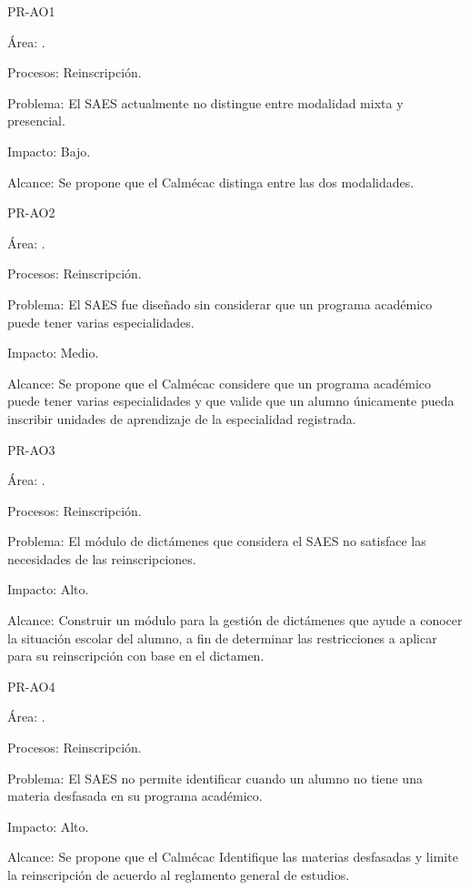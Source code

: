 \begin{AreaOportunidad}{PR-AO1}
	\item[Área:] .
	\item[Procesos:] Reinscripción.
	\item[Problema:] El SAES actualmente no distingue entre modalidad mixta y presencial.
	\item[Impacto:] Bajo.
	\item[Alcance:] Se propone que el Calmécac distinga entre las dos modalidades.
\end{AreaOportunidad}


\begin{AreaOportunidad}{PR-AO2}
	\item[Área:] .
	\item[Procesos:] Reinscripción.
	\item[Problema:] El SAES fue diseñado sin considerar que un programa académico puede tener varias especialidades.
	\item[Impacto:] Medio.
	\item[Alcance:]Se propone que el Calmécac considere que un programa académico puede tener varias especialidades y que valide que un alumno únicamente pueda inscribir unidades de aprendizaje de la especialidad registrada.
\end{AreaOportunidad}



\begin{AreaOportunidad}{PR-AO3}
	\item[Área:] .
	\item[Procesos:] Reinscripción.
	\item[Problema:] El módulo de dictámenes que considera el SAES no satisface las necesidades de las reinscripciones.
	\item[Impacto:] Alto.
	\item[Alcance:]Construir un módulo para la gestión de dictámenes que ayude a conocer la situación escolar del alumno, a fin de determinar las restricciones a aplicar para su reinscripción con base en el dictamen.	
\end{AreaOportunidad}


\begin{AreaOportunidad}{PR-AO4}
	\item[Área:] .
	\item[Procesos:] Reinscripción.
	\item[Problema:] El SAES no permite identificar cuando un alumno no tiene una materia desfasada en su programa académico.
	\item[Impacto:] Alto.
	\item[Alcance:]Se propone que el Calmécac Identifique las materias desfasadas y limite la reinscripción de acuerdo al reglamento general de estudios.	
\end{AreaOportunidad}

